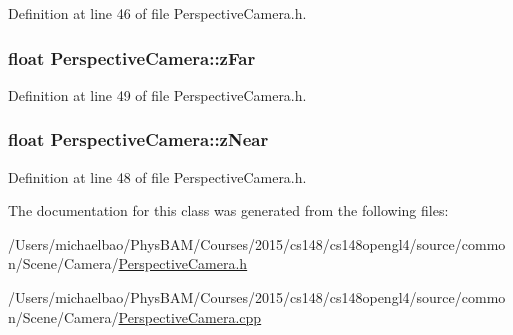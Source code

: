 Definition at line 46 of file Perspective\+Camera.\+h.

\hypertarget{class_perspective_camera_af88e6161cd3c818d49e6421f52474a2b}{}
\subsubsection[{z\+Far}]{\setlength{\rightskip}{0pt plus 5cm}float Perspective\+Camera\+::z\+Far\hspace{0.3cm}{\ttfamily [private]}}\label{class_perspective_camera_af88e6161cd3c818d49e6421f52474a2b}


Definition at line 49 of file Perspective\+Camera.\+h.

\hypertarget{class_perspective_camera_a11c1dcd1bdeb4bf8294d6272fb4d2695}{}
\subsubsection[{z\+Near}]{\setlength{\rightskip}{0pt plus 5cm}float Perspective\+Camera\+::z\+Near\hspace{0.3cm}{\ttfamily [private]}}\label{class_perspective_camera_a11c1dcd1bdeb4bf8294d6272fb4d2695}


Definition at line 48 of file Perspective\+Camera.\+h.



The documentation for this class was generated from the following files\+:\begin{DoxyCompactItemize}
\item 
/\+Users/michaelbao/\+Phys\+B\+A\+M/\+Courses/2015/cs148/cs148opengl4/source/common/\+Scene/\+Camera/\hyperlink{_perspective_camera_8h}{Perspective\+Camera.\+h}\item 
/\+Users/michaelbao/\+Phys\+B\+A\+M/\+Courses/2015/cs148/cs148opengl4/source/common/\+Scene/\+Camera/\hyperlink{_perspective_camera_8cpp}{Perspective\+Camera.\+cpp}\end{DoxyCompactItemize}
